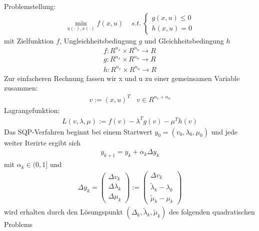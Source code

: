 \documentclass[12pt,a4paper]{article}
\begin{document}
  Problemstellung:
  \begin{align*}
     \min_{u(\cdot), x(\cdot)} f(x,u) \ \ \ \ \
     s.t. \ 
     \left\lbrace   \begin{array}{c} g(x,u) \leq 0\\ h(x,u) = 0 \end{array} \right.
  \end{align*}
  mit Zielfunktion $f$, Ungleichheitsbedingung $g$ und Gleichheitsbedingung $h$
  \begin{align*}
     f:R^{n_{x}}\times R^{n_{u}} \rightarrow R \\
     g:R^{n_{x}}\times R^{n_{u}} \rightarrow R \\
     h:R^{n_{x}}\times R^{n_{u}} \rightarrow R
  \end{align*}
  Zur einfacheren Rechnung fassen wir x und u zu einer gemeinsamen Variable zusammen:  
  \begin{align*}
     v := (x, u)^{T} \ \ \ \ v\in R^{n_{x} + n_{u}}
  \end{align*}
  Lagrangefunktion:
  \begin{align*}
     L(v,\lambda,\mu) := f(v) - \lambda^{T}g(v) - \mu^{T}h(v)
  \end{align*}
  Das SQP-Verfahren beginnt bei einem Startwert $ y_{0} = (v_{0},\lambda_{0},\mu_{0}) $ und jede weiter Iterirte ergibt sich
  \begin{align*}
  y_{k+1} = y_{k} + \alpha_{k} \Delta y_{k}
  \end{align*}
  mit $ \alpha_{k} \in (0,1] $ und
  \begin{align*}
  \Delta y_{k} = 
  \left( \begin{array}{c} \Delta v_{k} \\ \Delta \lambda_{k} \\ \Delta \mu_{k} \end{array} \right) := 
  \left( \begin{array}{c} \Delta v_{k} \\ \tilde{\lambda}_{k}- \lambda_{k} \\ \tilde{\mu}_{k} -  \mu_{k} \end{array} \right)
  \end{align*}
  wird erhalten durch den Lösungspunkt $ ( \Delta_{k} ,\tilde{\lambda}_{k}, \tilde{\mu}_{k} )  $ des folgenden quadratischen Problems
  
\end{document}
